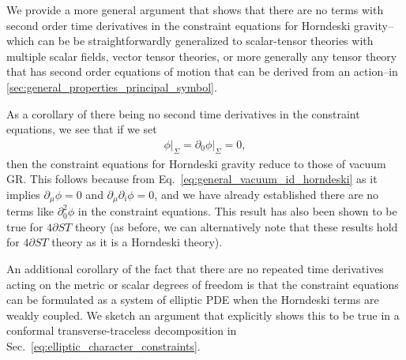\documentclass{ws-ijmpd}
\begin{document}
We provide a more general argument that shows that
there are no terms with second order time derivatives
in the constraint equations for Horndeski gravity--which can be be 
straightforwardly generalized to scalar-tensor
theories with multiple scalar fields\cite{Tanahashi:2017kgn,Kobayashi:2019hrl},
vector tensor theories\cite{doi:10.1063/1.522837,Davies:2021frz},
or more generally any tensor theory that has second order equations of motion
that can be derived from an action--in 
\ref{sec:general_properties_principal_symbol}.

As a corollary of there being no second time derivatives in the constraint
equations, we see that if we set
\begin{align}
\label{eq:general_vacuum_id_horndeski}
   \phi\big|_{\Sigma} 
   = 
   \partial_0\phi\big|_{\Sigma} 
   = 
   0
   ,
\end{align}
then the constraint equations for Horndeski gravity reduce to those of 
vacuum GR. This follows because from 
Eq.~\eqref{eq:general_vacuum_id_horndeski} as it implies 
$\partial_{\mu}\phi=0$
and $\partial_{\mu}\partial_i\phi=0$, and we have already
established there are no terms like $\partial_0^2\phi$ in the constraint
equations.
This result has also been shown to be true for 
$4\partial ST$ theory\cite{East:2020hgw} 
(as before, we can alternatively note that these
results hold for $4\partial ST$ theory as it is a Horndeski theory).

An additional corollary of the fact that there are no repeated
time derivatives acting on the metric or scalar degrees
of freedom is that the constraint equations can be formulated as 
a system of elliptic PDE when the Horndeski terms are weakly coupled.
We sketch an argument that explicitly shows this to be true
in a conformal transverse-traceless decomposition
in Sec.~\ref{eq:elliptic_character_constraints}.
\end{document}
